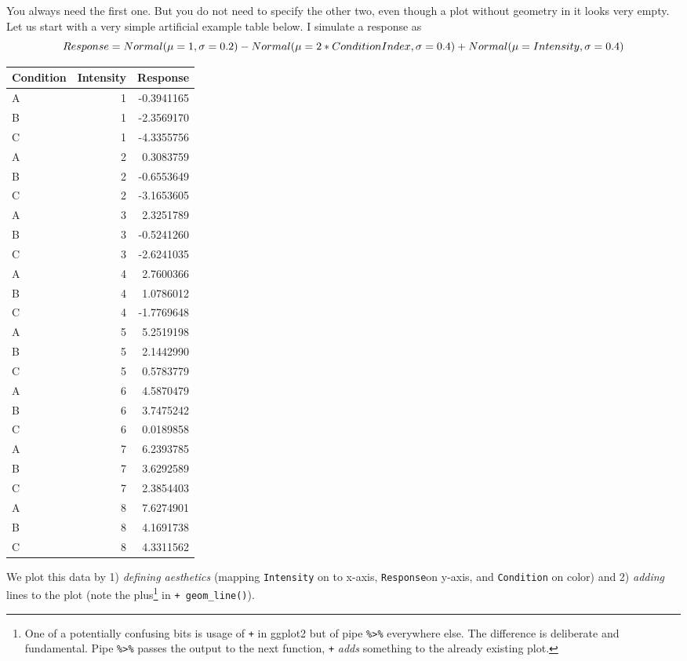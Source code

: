 \documentclass[
]{book}
\begin{document}
You always need the first one. But you do not need to specify the other two, even though a plot without geometry in it looks very empty. Let us start with a very simple artificial example table below. I simulate a response as
\[Response = Normal(\mu=1, \sigma=0.2) - \\
Normal(\mu=2*ConditionIndex, \sigma=0.4) + \\ Normal(\mu=Intensity, \sigma=0.4)\]

\begin{tabular}{l|r|r}
\hline
Condition & Intensity & Response\\
\hline
A & 1 & -0.3941165\\
\hline
B & 1 & -2.3569170\\
\hline
C & 1 & -4.3355756\\
\hline
A & 2 & 0.3083759\\
\hline
B & 2 & -0.6553649\\
\hline
C & 2 & -3.1653605\\
\hline
A & 3 & 2.3251789\\
\hline
B & 3 & -0.5241260\\
\hline
C & 3 & -2.6241035\\
\hline
A & 4 & 2.7600366\\
\hline
B & 4 & 1.0786012\\
\hline
C & 4 & -1.7769648\\
\hline
A & 5 & 5.2519198\\
\hline
B & 5 & 2.1442990\\
\hline
C & 5 & 0.5783779\\
\hline
A & 6 & 4.5870479\\
\hline
B & 6 & 3.7475242\\
\hline
C & 6 & 0.0189858\\
\hline
A & 7 & 6.2393785\\
\hline
B & 7 & 3.6292589\\
\hline
C & 7 & 2.3854403\\
\hline
A & 8 & 7.6274901\\
\hline
B & 8 & 4.1691738\\
\hline
C & 8 & 4.3311562\\
\hline
\end{tabular}

We plot this data by 1) \emph{defining aesthetics} (mapping \texttt{Intensity} on to x-axis, \texttt{Response}on y-axis, and \texttt{Condition} on color) and 2) \emph{adding} lines to the plot (note the plus\footnote{One of a potentially confusing bits is usage of \texttt{+} in ggplot2 but of pipe \texttt{\%\textgreater{}\%} everywhere else. The difference is deliberate and fundamental. Pipe \texttt{\%\textgreater{}\%} passes the output to the next function, \texttt{+} \emph{adds} something to the already existing plot.} in \texttt{+\ geom\_line()}).
\end{document}
